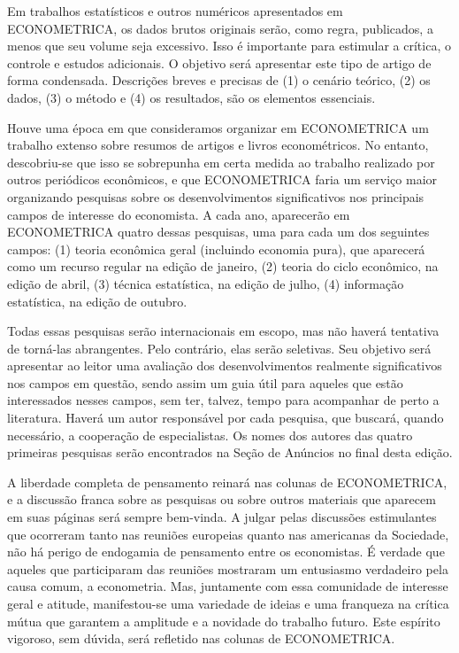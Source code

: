 \documentclass[12pt]{article}
\begin{document}
Em trabalhos estatísticos e outros numéricos apresentados em ECONOMETRICA, os dados brutos originais serão, como regra, publicados, a menos que seu volume seja excessivo. Isso é importante para estimular a crítica, o controle e estudos adicionais. O objetivo será apresentar este tipo de artigo de forma condensada. Descrições breves e precisas de (1) o cenário teórico, (2) os dados, (3) o método e (4) os resultados, são os elementos essenciais.

Houve uma época em que consideramos organizar em ECONOMETRICA um trabalho extenso sobre resumos de artigos e livros econométricos. No entanto, descobriu-se que isso se sobrepunha em certa medida ao trabalho realizado por outros periódicos econômicos, e que ECONOMETRICA faria um serviço maior organizando pesquisas sobre os desenvolvimentos significativos nos principais campos de interesse do economista. A cada ano, aparecerão em ECONOMETRICA quatro dessas pesquisas, uma para cada um dos seguintes campos: (1) teoria econômica geral (incluindo economia pura), que aparecerá como um recurso regular na edição de janeiro, (2) teoria do ciclo econômico, na edição de abril, (3) técnica estatística, na edição de julho, (4) informação estatística, na edição de outubro.

Todas essas pesquisas serão internacionais em escopo, mas não haverá tentativa de torná-las abrangentes. Pelo contrário, elas serão seletivas. Seu objetivo será apresentar ao leitor uma avaliação dos desenvolvimentos realmente significativos nos campos em questão, sendo assim um guia útil para aqueles que estão interessados nesses campos, sem ter, talvez, tempo para acompanhar de perto a literatura. Haverá um autor responsável por cada pesquisa, que buscará, quando necessário, a cooperação de especialistas. Os nomes dos autores das quatro primeiras pesquisas serão encontrados na Seção de Anúncios no final desta edição.

A liberdade completa de pensamento reinará nas colunas de ECONOMETRICA, e a discussão franca sobre as pesquisas ou sobre outros materiais que aparecem em suas páginas será sempre bem-vinda. A julgar pelas discussões estimulantes que ocorreram tanto nas reuniões europeias quanto nas americanas da Sociedade, não há perigo de endogamia de pensamento entre os economistas. É verdade que aqueles que participaram das reuniões mostraram um entusiasmo verdadeiro pela causa comum, a econometria. Mas, juntamente com essa comunidade de interesse geral e atitude, manifestou-se uma variedade de ideias e uma franqueza na crítica mútua que garantem a amplitude e a novidade do trabalho futuro. Este espírito vigoroso, sem dúvida, será refletido nas colunas de ECONOMETRICA.
\end{document}
